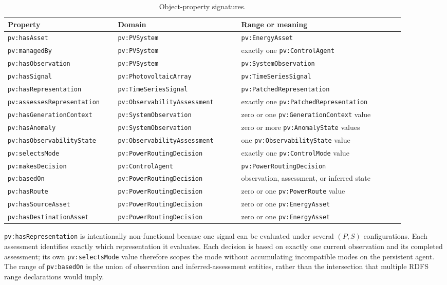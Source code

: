 \documentclass[
	letterpaper,
	10pt,
	unnumberedsections,
	twoside,
]{LTJournalArticle}
\newcommand{\pv}[1]{\texttt{pv:#1}}
\begin{document}
\begin{table}[H]
\centering
\small
\begin{tabular}{@{}L{0.25\linewidth}L{0.29\linewidth}L{0.37\linewidth}@{}}
\toprule
\textbf{Property} & \textbf{Domain} & \textbf{Range or meaning} \\
\midrule
\pv{hasAsset} & \pv{PVSystem} & \pv{EnergyAsset} \\
\pv{managedBy} & \pv{PVSystem} & exactly one \pv{ControlAgent} \\
\pv{hasObservation} & \pv{PVSystem} & \pv{SystemObservation} \\
\pv{hasSignal} & \pv{PhotovoltaicArray} & \pv{TimeSeriesSignal} \\
\pv{hasRepresentation} & \pv{TimeSeriesSignal} & \pv{PatchedRepresentation} \\
\pv{assessesRepresentation} & \pv{ObservabilityAssessment} & exactly one \pv{PatchedRepresentation} \\
\pv{hasGenerationContext} & \pv{SystemObservation} & zero or one \pv{GenerationContext} value \\
\pv{hasAnomaly} & \pv{SystemObservation} & zero or more \pv{AnomalyState} values \\
\pv{hasObservabilityState} & \pv{ObservabilityAssessment} & one \pv{ObservabilityState} value \\
\pv{selectsMode} & \pv{PowerRoutingDecision} & exactly one \pv{ControlMode} value \\
\pv{makesDecision} & \pv{ControlAgent} & \pv{PowerRoutingDecision} \\
\pv{basedOn} & \pv{PowerRoutingDecision} & observation, assessment, or inferred state \\
\pv{hasRoute} & \pv{PowerRoutingDecision} & zero or one \pv{PowerRoute} value \\
\pv{hasSourceAsset} & \pv{PowerRoutingDecision} & zero or one \pv{EnergyAsset} \\
\pv{hasDestinationAsset} & \pv{PowerRoutingDecision} & zero or one \pv{EnergyAsset} \\
\bottomrule
\end{tabular}
\caption{Object-property signatures.}
\label{tab:objects}
\end{table}

\pv{hasRepresentation} is intentionally non-functional because one signal can be evaluated under several $(P,S)$ configurations. Each assessment identifies exactly which representation it evaluates. Each decision is based on exactly one current observation and its completed assessment; its own \pv{selectsMode} value therefore scopes the mode without accumulating incompatible modes on the persistent agent. The range of \pv{basedOn} is the union of observation and inferred-assessment entities, rather than the intersection that multiple RDFS range declarations would imply.
\end{document}
